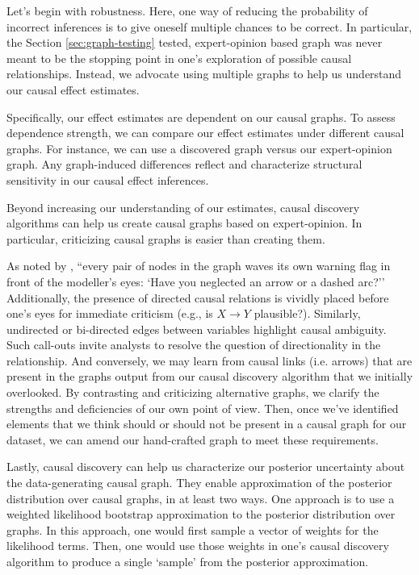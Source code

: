 Let's begin with robustness.
Here, one way of reducing the probability of incorrect inferences is to give oneself multiple chances to be correct.
In particular, the Section \ref{sec:graph-testing} tested, expert-opinion based graph was never meant to be the stopping point in one's exploration of possible causal relationships.
Instead, we advocate using multiple graphs to help us understand our causal effect estimates.

Specifically, our effect estimates are dependent on our causal graphs.
To assess dependence strength, we can compare our effect estimates under different causal graphs.
For instance, we can use a discovered graph versus our expert-opinion graph.
Any graph-induced differences reflect and characterize structural sensitivity in our causal effect inferences.

Beyond increasing our understanding of our estimates, causal discovery algorithms can help us create causal graphs based on expert-opinion.
In particular, criticizing causal graphs is easier than creating them.

As noted by \citet[p. 708]{pearl_1995_causal}, ``every pair of nodes in the graph waves its own warning flag in front of the modeller's eyes: `Have you neglected an arrow or a dashed arc?''
Additionally, the presence of directed causal relations is vividly placed before one's eyes for immediate criticism (e.g., is $X \rightarrow Y$ plausible?).
Similarly, undirected or bi-directed edges between variables highlight causal ambiguity.
Such call-outs invite analysts to resolve the question of directionality in the relationship.
And conversely, we may learn from causal links (i.e. arrows) that are present in the graphs output from our causal discovery algorithm that we initially overlooked.
By contrasting and criticizing alternative graphs, we clarify the strengths and deficiencies of our own point of view.
Then, once we've identified elements that we think should or should not be present in a causal graph for our dataset, we can amend our hand-crafted graph to meet these requirements.

Lastly, causal discovery can help us characterize our posterior uncertainty about the data-generating causal graph.
They enable approximation of the posterior distribution over causal graphs, in at least two ways.
One approach is to use a weighted likelihood bootstrap approximation \citep{newton_1994_approximate} to the posterior distribution over graphs.
In this approach, one would first sample a vector of weights for the likelihood terms.
Then, one would use those weights in one's causal discovery algorithm to produce a single `sample' from the posterior approximation.


